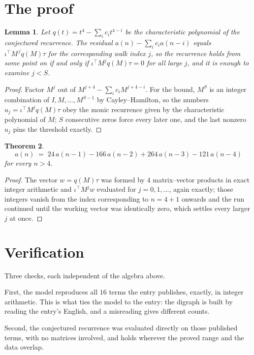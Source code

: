 \documentclass[11pt,a4paper]{article}
\theoremstyle{plain}
\newtheorem{theorem}{Theorem}
\newtheorem{lemma}[theorem]{Lemma}
\theoremstyle{definition}
\begin{document}
\section{The proof}

\begin{lemma}\label{lem:crit}
Let $q(t)=t^{4}-\sum_i c_it^{4-i}$ be the characteristic polynomial of the
conjectured recurrence. The residual $a(n)-\sum_ic_ia(n-i)$ equals
$\iota^{\!\top}M^{\,j}q(M)\tau$ for the corresponding walk index $j$, so the recurrence
holds from some point on if and only if $\iota^{\!\top}M^{j}q(M)\tau=0$ for all large $j$,
and it is enough to examine $j<S$.
\end{lemma}

\begin{proof}
Factor $M^{j}$ out of $M^{j+4}-\sum_ic_iM^{j+4-i}$. For the bound, $M^{S}$
is an integer combination of $I,M,\dots,M^{S-1}$ by Cayley--Hamilton, so the numbers
$u_j=\iota^{\!\top}M^{j}q(M)\tau$ obey the monic recurrence given by the characteristic
polynomial of $M$; $S$ consecutive zeros force every later one, and the last nonzero $u_j$
pins the threshold exactly.
\end{proof}

\begin{theorem}
\[
a(n)\;=\;24\,a(n-1) - 166\,a(n-2) + 264\,a(n-3) - 121\,a(n-4)
\]
for every $n>4$.
\end{theorem}

\begin{proof}
The vector $w=q(M)\tau$ was formed by $4$ matrix--vector products in exact integer
arithmetic and $\iota^{\!\top}M^{j}w$ evaluated for $j=0,1,\dots$, again exactly; those
integers vanish from the index corresponding to $n=4+1$ onwards and the run continued
until the working vector was identically zero, which settles every larger $j$ at once.
\end{proof}

\section{Verification}

Three checks, each independent of the algebra above.

First, the model reproduces all $16$ terms the entry publishes, exactly, in integer
arithmetic. This is what ties the model to the entry: the digraph is built by reading the
entry's English, and a misreading gives different counts.

Second, the conjectured recurrence was evaluated directly on those published terms, with no
matrices involved, and holds wherever the proved range and the data overlap.
\end{document}
